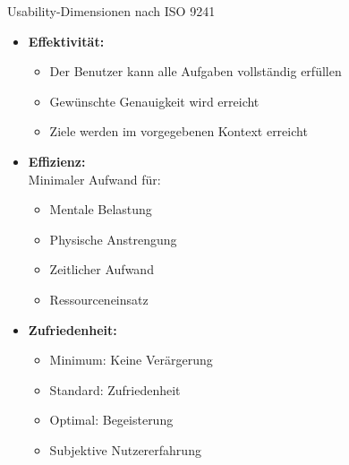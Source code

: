 \begin{definition}{Usability-Dimensionen nach ISO 9241}
\begin{itemize}
    \item \textbf{Effektivität:}
    \begin{itemize}
        \item Der Benutzer kann alle Aufgaben vollständig erfüllen
        \item Gewünschte Genauigkeit wird erreicht
        \item Ziele werden im vorgegebenen Kontext erreicht
    \end{itemize}
    \end{itemize}

\begin{minipage}{0.5\linewidth}
    \begin{itemize}
    \item \textbf{Effizienz:} \\ Minimaler Aufwand für:
    \begin{itemize}
        \item Mentale Belastung
        \item Physische Anstrengung
        \item Zeitlicher Aufwand
        \item Ressourceneinsatz
    \end{itemize}
    \end{itemize}
\end{minipage}
\begin{minipage}{0.5\linewidth}
    \begin{itemize}
    \item \textbf{Zufriedenheit:}
    \begin{itemize}
        \item Minimum: Keine Verärgerung
        \item Standard: Zufriedenheit
        \item Optimal: Begeisterung
        \item Subjektive Nutzererfahrung
    \end{itemize}
\end{itemize}
\end{minipage}
\end{definition}

